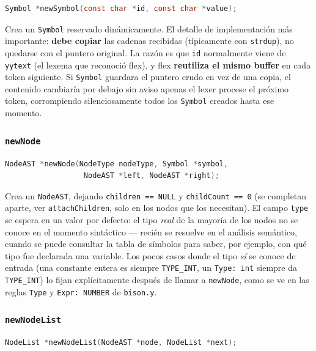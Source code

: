 \documentclass[11pt,a4paper]{article}
\begin{document}
\begin{lstlisting}[language=C]
Symbol *newSymbol(const char *id, const char *value);
\end{lstlisting}

Crea un \texttt{Symbol} reservado din\'amicamente. El detalle de
implementaci\'on m\'as importante: \textbf{debe copiar} las cadenas
recibidas (t\'ipicamente con \texttt{strdup}), no quedarse con el
puntero original. La raz\'on es que \texttt{id} normalmente viene de
\texttt{yytext} (el lexema que reconoci\'o flex), y flex \textbf{reutiliza
el mismo buffer} en cada token siguiente. Si \texttt{Symbol} guardara
el puntero crudo en vez de una copia, el contenido cambiar\'ia por
debajo sin aviso apenas el lexer procese el pr\'oximo token, corrompiendo
silenciosamente todos los \texttt{Symbol} creados hasta ese momento.

\subsubsection{\texttt{newNode}}

\begin{lstlisting}[language=C]
NodeAST *newNode(NodeType nodeType, Symbol *symbol,
                  NodeAST *left, NodeAST *right);
\end{lstlisting}

Crea un \texttt{NodeAST}, dejando \texttt{children == NULL} y
\texttt{childCount == 0} (se completan aparte, ver
\texttt{attachChildren}, solo en los nodos que los necesitan). El
campo \texttt{type} se espera en un valor por defecto: el tipo
\emph{real} de la mayor\'ia de los nodos no se conoce en el momento
sint\'actico --- reci\'en se resuelve en el an\'alisis sem\'antico, cuando
se puede consultar la tabla de s\'imbolos para saber, por ejemplo, con
qu\'e tipo fue declarada una variable. Los pocos casos donde el tipo
\emph{s\'i} se conoce de entrada (una constante entera es siempre
\texttt{TYPE\_INT}, un \texttt{Type: int} siempre da \texttt{TYPE\_INT})
lo fijan expl\'icitamente despu\'es de llamar a \texttt{newNode}, como se
ve en las reglas \texttt{Type} y \texttt{Expr: NUMBER} de
\texttt{bison.y}.

\subsubsection{\texttt{newNodeList}}

\begin{lstlisting}[language=C]
NodeList *newNodeList(NodeAST *node, NodeList *next);
\end{lstlisting}
\end{document}
